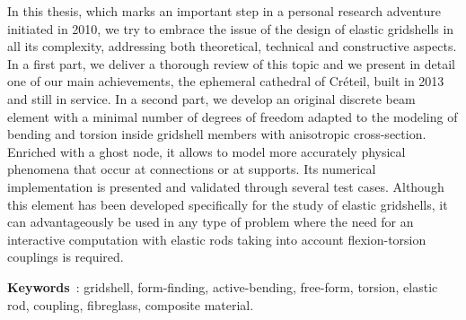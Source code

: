 In this thesis, which marks an important step in a personal research adventure initiated in 2010, we try to embrace the issue of the design of elastic gridshells in all its complexity, addressing both theoretical, technical and constructive aspects. In a first part, we deliver a thorough review of this topic and we present in detail one of our main achievements, the ephemeral cathedral of Créteil, built in 2013 and still in service. In a second part, we develop an original discrete beam element with a minimal number of degrees of freedom adapted to the modeling of bending and torsion inside gridshell members with anisotropic cross-section. Enriched with a ghost node, it allows to model more accurately physical phenomena that occur at connections or at supports. Its numerical implementation is presented and validated through several test cases. Although this element has been developed specifically for the study of elastic gridshells, it can advantageously be used in any type of problem where the need for an interactive computation with elastic rods taking into account flexion-torsion couplings is required.

\textbf{Keywords}~: gridshell, form-finding, active-bending, free-form, torsion, elastic rod, coupling, fibreglass, composite material.

